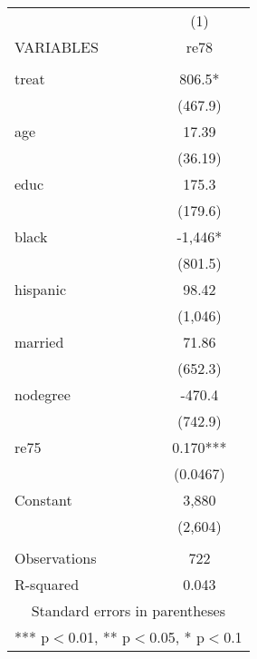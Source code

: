 \begin{tabular}{lc} \hline
 & (1) \\
VARIABLES & re78 \\ \hline
 &  \\
treat & 806.5* \\
 & (467.9) \\
age & 17.39 \\
 & (36.19) \\
educ & 175.3 \\
 & (179.6) \\
black & -1,446* \\
 & (801.5) \\
hispanic & 98.42 \\
 & (1,046) \\
married & 71.86 \\
 & (652.3) \\
nodegree & -470.4 \\
 & (742.9) \\
re75 & 0.170*** \\
 & (0.0467) \\
Constant & 3,880 \\
 & (2,604) \\
 &  \\
Observations & 722 \\
 R-squared & 0.043 \\ \hline
\multicolumn{2}{c}{ Standard errors in parentheses} \\
\multicolumn{2}{c}{ *** p$<$0.01, ** p$<$0.05, * p$<$0.1} \\
\end{tabular}
